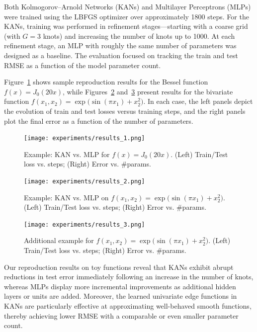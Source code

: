 \documentclass[conference]{IEEEtran}
\begin{document}
Both Kolmogorov–Arnold Networks (KANs) and Multilayer Perceptrons (MLPs) were
trained using the LBFGS optimizer over approximately 1800 steps. For the KANs,
training was performed in refinement stages---starting with a coarse grid (with
\( G=3 \) knots) and increasing the number of knots up to 1000. At each
refinement stage, an MLP with roughly the same number of parameters was
designed as a baseline. The evaluation focused on tracking the train and test
RMSE as a function of the model parameter count.

Figure~\ref{fig:results1} shows sample reproduction results for the Bessel
function \( f(x)=J_0(20x) \), while Figures~\ref{fig:results2}
and~\ref{fig:results3} present results for the bivariate function \(
f(x_1,x_2)=\exp\bigl(\sin(\pi x_1)+x_2^2\bigr) \). In each case, the left
panels depict the evolution of train and test losses versus training steps, and
the right panels plot the final error as a function of the number of
parameters.

\begin{figure}[H]
    \centering
    \texttt{[image: experiments/results\_1.png]}
    \caption{Example: KAN vs. MLP for \(f(x)=J_0(20x)\). (Left) Train/Test loss vs. steps; (Right) Error vs. \#params.}
    \label{fig:results1}
\end{figure}

\begin{figure}[H]
    \centering
    \texttt{[image: experiments/results\_2.png]}
    \caption{Example: KAN vs. MLP on \(f(x_1,x_2)=\exp\bigl(\sin(\pi x_1)+x_2^2\bigr)\). (Left) Train/Test loss vs. steps; (Right) Error vs. \#params.}
    \label{fig:results2}
\end{figure}

\begin{figure}[H]
    \centering
    \texttt{[image: experiments/results\_3.png]}
    \caption{Additional example for \(f(x_1,x_2)=\exp\bigl(\sin(\pi x_1)+x_2^2\bigr)\). (Left) Train/Test loss vs. steps; (Right) Error vs. \#params.}
    \label{fig:results3}
\end{figure}

Our reproduction results on toy functions reveal that KANs exhibit abrupt
reductions in test error immediately following an increase in the number of
knots, whereas MLPs display more incremental improvements as additional hidden
layers or units are added. Moreover, the learned univariate edge functions in
KANs are particularly effective at approximating well-behaved smooth functions,
thereby achieving lower RMSE with a comparable or even smaller parameter count.
\end{document}
